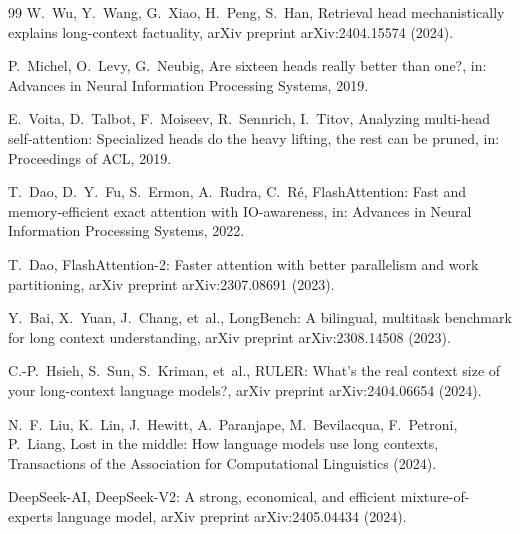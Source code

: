 \documentclass[final,5p,times,twocolumn]{elsarticle}
\theoremstyle{definition}
\theoremstyle{remark}
\begin{document}
\begin{thebibliography}{99}
W.~Wu, Y.~Wang, G.~Xiao, H.~Peng, S.~Han,
Retrieval head mechanistically explains long-context factuality,
arXiv preprint arXiv:2404.15574 (2024).

P.~Michel, O.~Levy, G.~Neubig,
Are sixteen heads really better than one?,
in: Advances in Neural Information Processing Systems, 2019.

E.~Voita, D.~Talbot, F.~Moiseev, R.~Sennrich, I.~Titov,
Analyzing multi-head self-attention: Specialized heads do the heavy
lifting, the rest can be pruned,
in: Proceedings of ACL, 2019.

T.~Dao, D.~Y.~Fu, S.~Ermon, A.~Rudra, C.~R\'e,
FlashAttention: Fast and memory-efficient exact attention with
IO-awareness,
in: Advances in Neural Information Processing Systems, 2022.

T.~Dao,
FlashAttention-2: Faster attention with better parallelism and work
partitioning,
arXiv preprint arXiv:2307.08691 (2023).

Y.~Bai, X.~Yuan, J.~Chang, et~al.,
LongBench: A bilingual, multitask benchmark for long context
understanding,
arXiv preprint arXiv:2308.14508 (2023).

C.-P.~Hsieh, S.~Sun, S.~Kriman, et~al.,
RULER: What's the real context size of your long-context language
models?,
arXiv preprint arXiv:2404.06654 (2024).

N.~F.~Liu, K.~Lin, J.~Hewitt, A.~Paranjape, M.~Bevilacqua,
F.~Petroni, P.~Liang,
Lost in the middle: How language models use long contexts,
Transactions of the Association for Computational Linguistics (2024).

DeepSeek-AI,
DeepSeek-V2: A strong, economical, and efficient mixture-of-experts
language model,
arXiv preprint arXiv:2405.04434 (2024).

\end{thebibliography}
\end{document}
